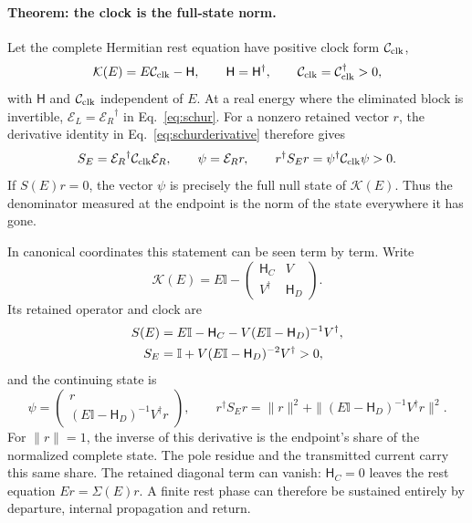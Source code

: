 \documentclass[aps,prx,onecolumn,10pt,notitlepage,nofootinbib,longbibliography]{revtex4-2}
\numberwithin{equation}{section}
\numberwithin{table}{section}
\newcommand{\Id}{\mathbb I}
\begin{document}
\paragraph*{Theorem: the clock is the full-state norm.}
Let the complete Hermitian rest equation have positive clock form $\mathcal C_{\rm clk}$,
\begin{equation}
 {\mathcal K}(E)=E\mathcal C_{\rm clk}-\mathsf H,\qquad \mathsf H=\mathsf H^\dagger,\qquad
 \mathcal C_{\rm clk}=\mathcal C_{\rm clk}^\dagger>0,
 \label{eq:fullrestform}
\end{equation}
with $\mathsf H$ and $\mathcal C_{\rm clk}$ independent of $E$. At a real energy where the eliminated block is invertible, ${\mathcal E_L}={\mathcal E_R}^\dagger$ in Eq.~\eqref{eq:schur}. For a nonzero retained vector $r$, the derivative identity in Eq.~\eqref{eq:schurderivative} therefore gives
\begin{equation}
 S_E={\mathcal E_R}^\dagger\mathcal C_{\rm clk} {\mathcal E_R},\qquad
 \psi={\mathcal E_R}r,\qquad
 r^\dagger S_Er=\psi^\dagger\mathcal C_{\rm clk}\psi>0.
 \label{eq:fullstatenorm}
\end{equation}
If $S(E)r=0$, the vector $\psi$ is precisely the full null state of ${\mathcal K}(E)$. Thus the denominator measured at the endpoint is the norm of the state everywhere it has gone.

In canonical coordinates this statement can be seen term by term. Write
\begin{equation}
 {\mathcal K}(E)=E\Id-
 \begin{pmatrix}\mathsf H_C&V\\V^\dagger&\mathsf H_D\end{pmatrix}.
\end{equation}
Its retained operator and clock are
\begin{align}
 S(E)&=E\Id-\mathsf H_C-V(E\Id-\mathsf H_D)^{-1}V^\dagger,\notag\\
 S_E&=\Id+V(E\Id-\mathsf H_D)^{-2}V^\dagger>0,
 \label{eq:positiveclock}
\end{align}
and the continuing state is
\begin{equation}
 \psi=\begin{pmatrix}r\\(E\Id-\mathsf H_D)^{-1}V^\dagger r\end{pmatrix},
 \qquad
 r^\dagger S_Er=\|r\|^2+
 \|(E\Id-\mathsf H_D)^{-1}V^\dagger r\|^2.
 \label{eq:returnnorm}
\end{equation}
For $\|r\|=1$, the inverse of this derivative is the endpoint's share of the normalized complete state. The pole residue and the transmitted current carry this same share. The retained diagonal term can vanish: $\mathsf H_C=0$ leaves the rest equation $Er=\Sigma(E)r$. A finite rest phase can therefore be sustained entirely by departure, internal propagation and return. 
\end{document}
